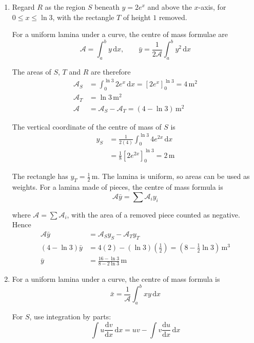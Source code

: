 \documentclass[leqno]{article}
\begin{document}
\begin{enumerate}[
  label=\textbf{\arabic*.},
  leftmargin=*,
  topsep=0pt,
  partopsep=0pt,
  parsep=0pt
]
\begin{djsSolution}
\begin{enumerate}[label=\textbf{(\alph*)}, start=1]
\item Regard \(R\) as the region \(S\) beneath \(y=2e^x\) and above the \(x\)-axis, for \(0\leq x\leq\ln3\), with the rectangle \(T\) of height \(1\) removed.

For a uniform lamina under a curve, the centre of mass formulae are
\[
\mathcal{A}=\int_a^b y\,\mathrm{d}x,
\qquad
\bar{y}=\frac{1}{2\mathcal{A}}\int_a^b y^2\,\mathrm{d}x
\]

The areas of \(S\), \(T\) and \(R\) are therefore
\begin{align*}
\mathcal{A}_S&=\int_0^{\ln3}2e^x\,\mathrm{d}x
=\left[2e^x\right]_0^{\ln3}=4\,\mathrm{m^2}\\
\mathcal{A}_T&=\ln3\,\mathrm{m^2}\\
\mathcal{A}&=\mathcal{A}_S-\mathcal{A}_T=(4-\ln3)\,\mathrm{m^2}
\end{align*}

The vertical coordinate of the centre of mass of \(S\) is
\begin{align*}
y_S
&=\frac{1}{2(4)}\int_0^{\ln3}4e^{2x}\,\mathrm{d}x\\
&=\frac18\left[2e^{2x}\right]_0^{\ln3}
=2\,\mathrm{m}
\end{align*}

The rectangle has \(y_T=\frac12\,\mathrm{m}\). The lamina is uniform, so areas can be used as weights. For a lamina made of pieces, the centre of mass formula is
\[
\mathcal{A}\bar{y}=\sum\mathcal{A}_iy_i
\]

where \(\mathcal{A}=\sum\mathcal{A}_i\), with the area of a removed piece counted as negative. Hence
\begin{align*}
\mathcal{A}\bar{y}&=\mathcal{A}_Sy_S-\mathcal{A}_Ty_T\\
(4-\ln3)\bar{y}&=4(2)-(\ln3)\left(\frac12\right)
=\left(8-\frac12\ln3\right)\,\mathrm{m^3}\\
\bar{y}&=\frac{16-\ln3}{8-2\ln3}\,\mathrm{m}
\end{align*}

\item For a uniform lamina under a curve, the centre of mass formula is
\[
\bar{x}=\frac{1}{\mathcal{A}}\int_a^b xy\,\mathrm{d}x
\]

For \(S\), use integration by parts:
\[
\int u\frac{\mathrm{d}v}{\mathrm{d}x}\,\mathrm{d}x=uv-\int v\frac{\mathrm{d}u}{\mathrm{d}x}\,\mathrm{d}x
\]


\end{enumerate}
\end{djsSolution}
\end{enumerate}
\end{document}

